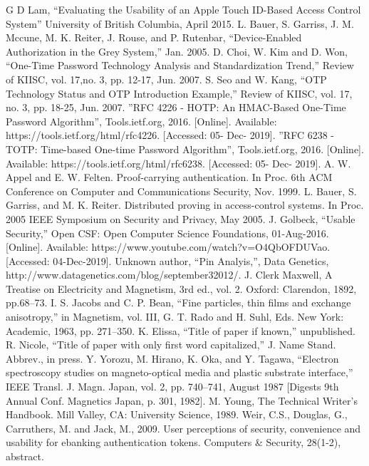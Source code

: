 \documentclass[conference]{IEEEtran}
\begin{document}
\begin{thebibliography}{00}
 G D Lam, “Evaluating the Usability of an Apple Touch ID-Based Access Control System” University of British Columbia, April 2015.
 L. Bauer, S. Garriss, J. M. Mccune, M. K. Reiter, J. Rouse, and P. Rutenbar, “Device-Enabled Authorization in the Grey System,” Jan. 2005.
 D. Choi, W. Kim and D. Won, “One-Time Password Technology Analysis and Standardization Trend,” Review of KIISC, vol. 17,no. 3, pp. 12-17, Jun. 2007.
 S. Seo and W. Kang, “OTP Technology Status and OTP Introduction Example,” Review of KIISC, vol. 17, no. 3, pp. 18-25, Jun. 2007.
 ”RFC 4226 - HOTP: An HMAC-Based One-Time Password Algorithm”, Tools.ietf.org, 2016. [Online]. Available: https://tools.ietf.org/html/rfc4226. [Accessed: 05- Dec- 2019].
 ”RFC 6238 - TOTP: Time-based One-time Password Algorithm”, Tools.ietf.org, 2016. [Online]. Available: https://tools.ietf.org/html/rfc6238. [Accessed: 05- Dec- 2019].
 A. W. Appel and E. W. Felten. Proof-carrying authentication. In Proc. 6th ACM Conference on Computer and Communications Security, Nov. 1999.
 L. Bauer, S. Garriss, and M. K. Reiter. Distributed proving in access-control systems. In Proc. 2005 IEEE Symposium on Security and Privacy, May 2005.
J. Golbeck, “Usable Security,” Open CSF: Open Computer Science Foundations, 01-Aug-2016. [Online]. Available: https://www.youtube.com/watch?v=O4QbOFDUVao. [Accessed: 04-Dec-2019].
 Unknown author, ``Pin Analyis,'', Data Genetics, http://www.datagenetics.com/blog/september32012/.
 J. Clerk Maxwell, A Treatise on Electricity and Magnetism, 3rd ed., vol. 2. Oxford: Clarendon, 1892, pp.68--73.
 I. S. Jacobs and C. P. Bean, ``Fine particles, thin films and exchange anisotropy,'' in Magnetism, vol. III, G. T. Rado and H. Suhl, Eds. New York: Academic, 1963, pp. 271--350.
 K. Elissa, ``Title of paper if known,'' unpublished.
 R. Nicole, ``Title of paper with only first word capitalized,'' J. Name Stand. Abbrev., in press.
 Y. Yorozu, M. Hirano, K. Oka, and Y. Tagawa, ``Electron spectroscopy studies on magneto-optical media and plastic substrate interface,'' IEEE Transl. J. Magn. Japan, vol. 2, pp. 740--741, August 1987 [Digests 9th Annual Conf. Magnetics Japan, p. 301, 1982].
 M. Young, The Technical Writer's Handbook. Mill Valley, CA: University Science, 1989.
 Weir, C.S., Douglas, G., Carruthers, M. and Jack, M., 2009. User perceptions of security, convenience and usability for ebanking authentication tokens. Computers \& Security, 28(1-2), abstract.
\end{thebibliography}
\end{document}

